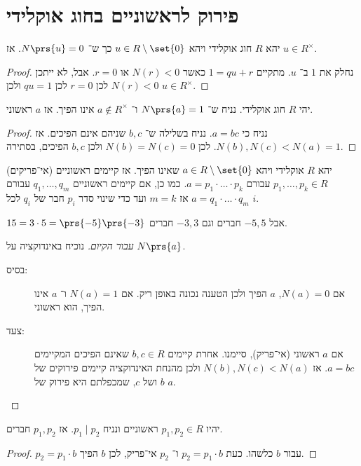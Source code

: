 \documentclass[a4paper,10pt,twoside,openany]{book}
\begin{document}
\section{פירוק לראשוניים בחוג אוקלידי}
\begin{proposition}
יהא
$R$
חוג אוקלידי ויהא
$u \in R \setminus \set{0}$
כך ש־%
$N\prs{u} = 0$.
אז
$u \in R^{\times}$.
\end{proposition}
\begin{proof}
נחלק את
$1$
ב־%
$u$.
מתקיים
$1 = qu + r$
כאשר
$N(r) < 0$
או
$r = 0$.
אבל, לא ייתכן
$N(r) < 0$
לכן
$r=0$
לכן
$qu = 1$
ולכן
$u \in R^{\times}$.
\end{proof}
\begin{proposition}
יהי
$R$
חוג אוקלידי.
נניח ש־%
$N\prs{a} = 1$
ו־%
$a \notin R^{\times}$
אינו הפיך.
אז
$a$
ראשוני.
\end{proposition}
\begin{proof}
נניח כי
$a=bc$.
נניח בשלילה ש־%
$b,c$
שניהם אינם הפיכים. אז
$N(b),N(c) < N(a) = 1$.
לכן
$N(b) = N(c) = 0$
ולכן
$b,c$
הפיכים, בסתירה.
\end{proof}
\begin{theorem}
יהא
$R$
אוקלידי ויהא
$a \in R \setminus \set{0}$
שאינו הפיך.
אז קיימים ראשוניים (אי־פריקים)
$p_1, \ldots, p_k \in R$
עבורם
$a = p_1 \cdot \ldots \cdot p_k$.
כמו כן, אם קיימים ראשוניים
$q_1, \ldots, q_m$
עבורם
$a = q_1\cdot\ldots\cdot q_m$
אז
$m=k$
ועד כדי שינוי סדר
$p_i$
חבר של
$q_i$
לכל
$i$.
\end{theorem}
\begin{example}
$15 = 3\cdot 5 = \prs{-5}\prs{-3}$
אבל
$-5,5$
חברים וגם
$-3,3$
חברים.
\end{example}
\begin{proof}[עבור הקיום]
נוכיח באינדוקציה על
$N\prs{a}$.
\begin{description}
\item[בסיס:]
אם
$N(a) = 0$,
$a$
הפיך ולכן הטענה נכונה באופן ריק.
אם
$N(a) = 1$
ו־%
$a$
אינו הפיך, הוא ראשוני.
\item[צעד:]
אם
$a$
ראשוני (אי־פריק), סיימנו. אחרת קיימים
$b,c \in R$
שאינם הפיכים המקיימים
$a=bc$.
אז
$N(b),N(c) < N(a)$
ולכן מהנחת האינדוקציה קיימים פירוקים של
$b$
ושל
$c$,
שמכפלתם היא פירוק של
$a$.
\end{description}
\end{proof}
\begin{proposition}
יהיו
$p_1,p_2 \in R$
ראשוניים ונניח
$p_1 \mid p_2$.
אז
$p_1,p_2$
חברים.
\end{proposition}
\begin{proof}
$p_2 = p_1 \cdot b$
עבור
$b$
כלשהו. כעת
$p_2 = p_1 \cdot b$
ו־%
$p_2$
אי־פריק, לכן
$b$
הפיך.
\end{proof}
\end{document}
